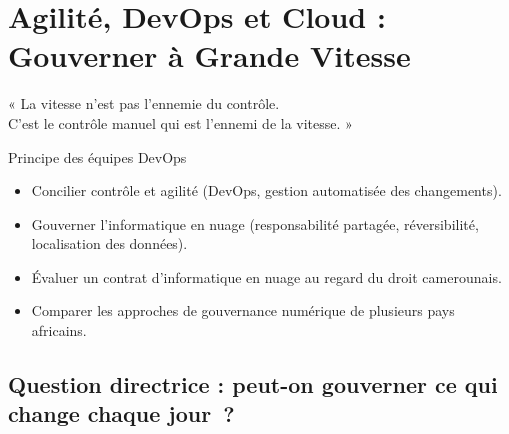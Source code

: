 
\chapter{Agilité, DevOps et Cloud : Gouverner à Grande Vitesse}
\label{chap:agile-cloud}

\epigraph{%
    « La vitesse n'est pas l'ennemie du contrôle.\\
    C'est le contrôle manuel qui est l'ennemi de la vitesse. »%
}{Principe des équipes DevOps}


\begin{boxobjectifs}
\begin{itemize}
    \item Concilier contrôle et agilité (DevOps, gestion automatisée des
          changements).
    \item Gouverner l'informatique en nuage (responsabilité partagée,
          réversibilité, localisation des données).
    \item Évaluer un contrat d'informatique en nuage au regard du droit
          camerounais.
    \item Comparer les approches de gouvernance numérique de plusieurs pays
          africains.
\end{itemize}
\end{boxobjectifs}

\bigskip

\section*{Question directrice : peut-on gouverner ce qui change chaque jour~?}

